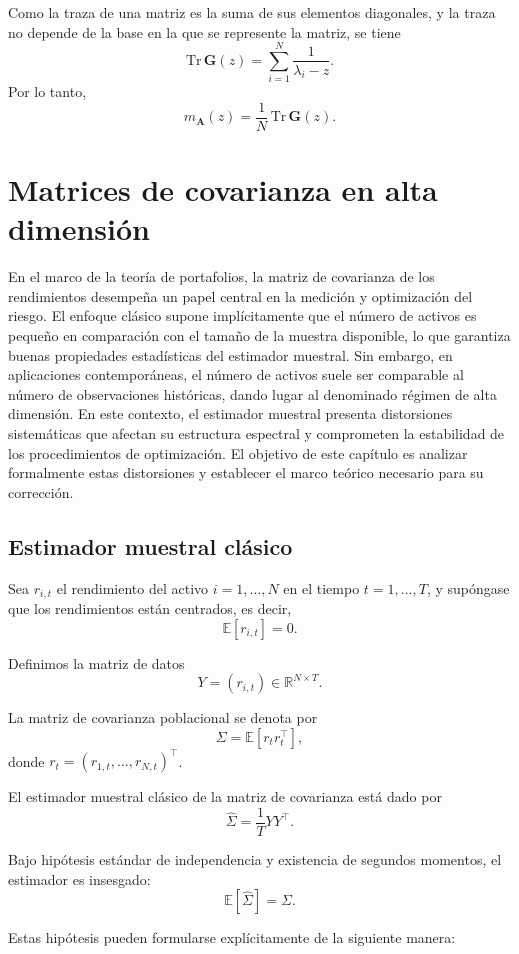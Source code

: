 \documentclass[letterpaper,12pt,oneside]{book}
\begin{document}
Como la traza de una matriz es la suma de sus elementos diagonales, y la traza no depende de la base en la que se represente la matriz, se tiene
\[
\mathrm{Tr}\,\mathbf{G}(z)
=
\sum_{i=1}^N \frac{1}{\lambda_i-z}.
\]
Por lo tanto,
\[
m_{\mathbf{A}}(z)
=
\frac{1}{N}\,\mathrm{Tr}\,\mathbf{G}(z).
\]

\chapter{Matrices de covarianza en alta dimensión}

En el marco de la teoría de portafolios, la matriz de covarianza de los rendimientos desempeña un papel central en la medición y optimización del riesgo. El enfoque clásico supone implícitamente que el número de activos es pequeño en comparación con el tamaño de la muestra disponible, lo que garantiza buenas propiedades estadísticas del estimador muestral. Sin embargo, en aplicaciones contemporáneas, el número de activos suele ser comparable al número de observaciones históricas, dando lugar al denominado régimen de alta dimensión. En este contexto, el estimador muestral presenta distorsiones sistemáticas que afectan su estructura espectral y comprometen la estabilidad de los procedimientos de optimización. El objetivo de este capítulo es analizar formalmente estas distorsiones y establecer el marco teórico necesario para su corrección.

\section{Estimador muestral clásico}

Sea $r_{i,t}$ el rendimiento del activo $i = 1,\dots,N$ en el tiempo 
$t = 1,\dots,T$, y supóngase que los rendimientos están centrados, es decir,
\[
\mathbb{E}[r_{i,t}] = 0.
\]

Definimos la matriz de datos
\[
Y = (r_{i,t}) \in \mathbb{R}^{N \times T}.
\]

La matriz de covarianza poblacional se denota por
\[
\Sigma = \mathbb{E}[r_t r_t^\top],
\]
donde $r_t = (r_{1,t},\dots,r_{N,t})^\top$.

El estimador muestral clásico de la matriz de covarianza está dado por
\[
\widehat{\Sigma} = \frac{1}{T} Y Y^\top.
\]

Bajo hipótesis estándar de independencia y existencia de segundos momentos, el estimador es insesgado:
\[
\mathbb{E}[\widehat{\Sigma}] = \Sigma.
\]

Estas hipótesis pueden formularse explícitamente de la siguiente manera:
\end{document}
